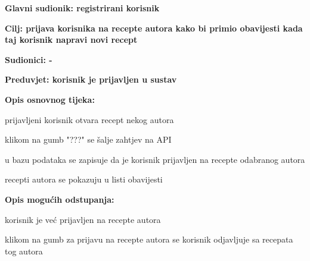 					\noindent {}
					\begin{packed_item}
						\item \textbf{Glavni sudionik: registrirani korisnik}
						\item  \textbf{Cilj: prijava korisnika na recepte autora kako bi primio obavijesti kada taj korisnik napravi novi recept}
						\item  \textbf{Sudionici: -}
						\item  \textbf{Preduvjet: korisnik je prijavljen u sustav}
						
						\item  \textbf{Opis osnovnog tijeka:}
						\item[] \begin{packed_enum}
							\item prijavljeni korisnik otvara recept nekog autora
							\item klikom na gumb "???" se šalje zahtjev na API
							\item u bazu podataka se zapisuje da je korisnik prijavljen na recepte odabranog autora
							\item recepti autora se pokazuju u listi obavijesti
						\end{packed_enum}
						
						\item  \textbf{Opis mogućih odstupanja:}
						\item[] \begin{packed_item}							
							\item[8.a] korisnik je već prijavljen na recepte autora
							\begin{packed_enum}
								\item klikom na gumb za prijavu na recepte autora se korisnik odjavljuje sa recepata tog autora
							\end{packed_enum}
						\end{packed_item}
					\end{packed_item}
				
				
				
